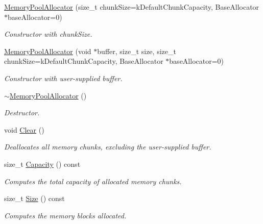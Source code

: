 \begin{DoxyCompactItemize}
\item 
\hyperlink{class_memory_pool_allocator_aeec85ac657f242ac5620115141be5209}{Memory\+Pool\+Allocator} (size\+\_\+t chunk\+Size=k\+Default\+Chunk\+Capacity, Base\+Allocator $\ast$base\+Allocator=0)
\begin{DoxyCompactList}\small\item\em Constructor with chunk\+Size. \end{DoxyCompactList}\item 
\hyperlink{class_memory_pool_allocator_a1f0d865093fdb955d956b7a445a8ddbf}{Memory\+Pool\+Allocator} (void $\ast$buffer, size\+\_\+t size, size\+\_\+t chunk\+Size=k\+Default\+Chunk\+Capacity, Base\+Allocator $\ast$base\+Allocator=0)
\begin{DoxyCompactList}\small\item\em Constructor with user-\/supplied buffer. \end{DoxyCompactList}\item 
\hyperlink{class_memory_pool_allocator_ad4eee0ef3cfe8cda31034fbce98b7a9b}{$\sim$\+Memory\+Pool\+Allocator} ()
\begin{DoxyCompactList}\small\item\em Destructor. \end{DoxyCompactList}\item 
\mbox{\label{class_memory_pool_allocator_a57bbc80e570db6110901b9a7e36dbda0}} 
void \hyperlink{class_memory_pool_allocator_a57bbc80e570db6110901b9a7e36dbda0}{Clear} ()
\begin{DoxyCompactList}\small\item\em Deallocates all memory chunks, excluding the user-\/supplied buffer. \end{DoxyCompactList}\item 
size\+\_\+t \hyperlink{class_memory_pool_allocator_a5672e0833fda2e71ce987911397489ed}{Capacity} () const
\begin{DoxyCompactList}\small\item\em Computes the total capacity of allocated memory chunks. \end{DoxyCompactList}\item 
size\+\_\+t \hyperlink{class_memory_pool_allocator_ae7fcf0341c13e899cf488bc7c8949956}{Size} () const
\begin{DoxyCompactList}\small\item\em Computes the memory blocks allocated. \end{DoxyCompactList}\item 

\end{DoxyCompactItemize}
